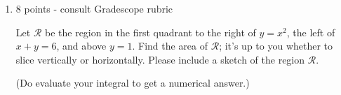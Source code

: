 \documentclass{article}
\begin{document}
\begin{enumerate}
\begin{enumerate}[resume]
    \begin{solution}
      Taking the limit as $n \to \infty$ of our Riemann sum, the exact
      area of $\mathcal{R}$ is $\boxed{ \int_0^2 \left( 2y - y^2 \right)
        dy}$. 
    \end{solution}

  \item
    \begin{problem}[\nstretch{3}]
      Evaluate the integrals you got in
      {{{{\#1}}(e)}} and
      {{{{\#1}}(i)}} to
      show that you get the same answer either way.
    \end{problem}

    \begin{solution}
      Our integral in
      {{{{\#1}}(e)}} was 
      \begin{align*}
        {\int_0^4 \left( \sqrt{x} - \frac{x}{2} \right) dx} &=
        \left. \frac{2}{3} x^{3/2} - \frac{x^2}{4} \right|_0^4 \\
        &= \left( \frac{2}{3} \cdot 4^{3/2} - 4 \right) - 0 \\
        &= \frac{2}{3} \cdot 8 - 4 \\
        &= \boxed{\frac{4}{3}}
      \end{align*}
      Our integral in
      {{{{\#1}}(i)}} was
      \begin{align*}
        { \int_0^2 \left( 2y - y^2 \right) dy} &= \left. y^2 -
          \frac{1}{3}y^3 \right|_0^2 \\
        &= \left( 4 - \frac{8}{3} \right) - 0 \\
        &= \frac{4}{3}
      \end{align*}      
    \end{solution}

  \end{enumerate}

\item

\begin{grading}
    8 points - consult Gradescope rubric
\end{grading}

\begin{problem}[\vfill\newpage]
    Let $\mathcal{R}$ be the region in the first quadrant to the right of
    $y = x^2$, the left of $x + y = 6$, and above $y = 1$.  Find the area
    of $\mathcal{R}$; it's up to you whether to slice vertically or
    horizontally.  Please include a sketch of the region $\mathcal{R}$.

    (Do evaluate your integral to get a numerical answer.)
  \end{problem}


\end{enumerate}
\end{document}
